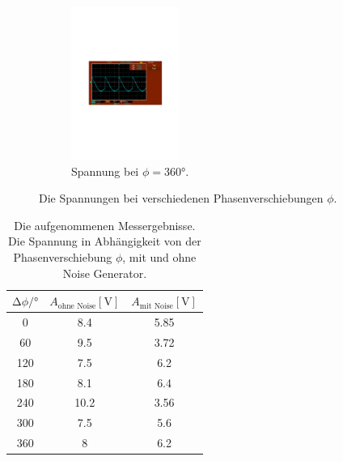\begin{figure}
\begin{subfigure}{0.48\textwidth}
      \centering
      \includegraphics[height=5cm]{content/abbildungen/ohne/360.pdf}
      \caption{Spannung bei $\phi = 360°$.}
      \label{fig:ohne_360}
  \end{subfigure}
\caption{Die Spannungen bei verschiedenen Phasenverschiebungen $\phi$.}
\label{fig:ohne}
\end{figure}

\begin{table}
  \centering
  \caption{Die aufgenommenen Messergebnisse. Die Spannung in Abhängigkeit von der Phasenverschiebung $\phi$, mit und ohne Noise Generator. } 
  \label{tab:data_ohne_mit}
  \begin{tabular}{c c c}
    \toprule
    $\increment \phi /°$ & $A_\text{ohne Noise} [\si{\volt}]$ & $A_\text{mit Noise} [\si{\volt}]$ \\
    \midrule
    0    &   8.4   &  5.85  \\
    60   &   9.5   &  3.72  \\
    120  &   7.5   &  6.2   \\
    180  &   8.1   &  6.4   \\
    240  &   10.2  &  3.56  \\
    300  &   7.5   &  5.6   \\
    360  &   8     &  6.2   \\
    \bottomrule
  \end{tabular}
\end{table}

